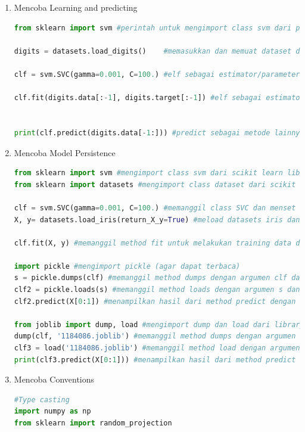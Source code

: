 \begin{enumerate}
\begin{lstlisting}[language=Python]
digits.target #memberikan informasi tentang data yang berhubungan atau juga dapat dijadikan sebagai label

digits.images[0] #Data selalu berupa array 2D, shape (n.samples, n.features), meskipun data aslinya mungkin memiliki bentuk yang berbeda.
\end{lstlisting}
\item Mencoba Learning and predicting
\begin{lstlisting}[language=Python]
from sklearn import svm #perintah untuk mengimport class svm dari package sklearn

digits = datasets.load_digits()    #memasukkan dan memuat dataset digits ke variabel digits

clf = svm.SVC(gamma=0.001, C=100.) #elf sebagai estimator/parameter, svm.SVC sebagai class, gamma sebagai parameter untuk menerapkan nilai secara manual

clf.fit(digits.data[:-1], digits.target[:-1]) #elf sebagai estimator/parameter, fit sebagai metode, digits.data sebagai item,[:-1] sebagai syntax python dan menampilkan outputnya


print(clf.predict(digits.data[-1:])) #predict sebagai metode lainnya, digit.data sebagai item menampilkan outputnya
\end{lstlisting}
\item Mencoba Model Persistence
\begin{lstlisting}[language=Python]
from sklearn import svm #mengimport class svm dari scikit learn library
from sklearn import datasets #mengimport class dataset dari scikit learn library
 
clf = svm.SVC(gamma=0.001, C=100.) #memanggil class SVC dan menset argument constructor SVC serta ditampung di variabel clf
X, y= datasets.load_iris(return_X_y=True) #meload datasets iris dan ditampung di variabel x untuk data sedangkan y untuk target

clf.fit(X, y) #memanggil method fit untuk melakukan training data dengan argumen data dan target dari database iris 

import pickle #mengimport pickle (agar dapat terbaca)
s = pickle.dumps(clf) #memanggil method dumps dengan argumen clf dan ditampung pada valiabel s
clf2 = pickle.loads(s) #memanggil method loads dengan argumen s dan ditampung di variabel clf2
clf2.predict(X[0:1]) #menampilkan hasil dari method predict dengan argumen data variabel x 

from joblib import dump, load #mengimport dump dan load dari library joblib
dump(clf, '1184086.joblib') #memanggil method dumps dengan argumen clf dari nama file joblib
clf3 = load('1184086.joblib') #memanggil method load dengan argumen nama file joblibnya
print(clf3.predict(X[0:1])) #menampilkan hasil dari method predict dengan argumen data variabel
\end{lstlisting}
\item Mencoba Conventions
\begin{lstlisting}[language=Python]
#Type casting
import numpy as np
from sklearn import random_projection


\end{lstlisting}
\end{enumerate}
